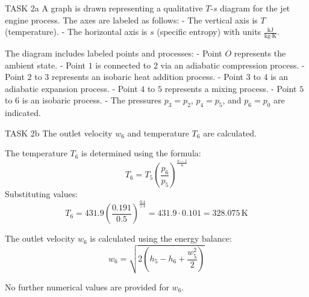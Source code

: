 TASK 2a  
A graph is drawn representing a qualitative \( T \)-\( s \) diagram for the jet engine process. The axes are labeled as follows:  
- The vertical axis is \( T \) (temperature).  
- The horizontal axis is \( s \) (specific entropy) with units \( \frac{\text{kJ}}{\text{kg·K}} \).  

The diagram includes labeled points and processes:  
- Point \( O \) represents the ambient state.  
- Point \( 1 \) is connected to \( 2 \) via an adiabatic compression process.  
- Point \( 2 \) to \( 3 \) represents an isobaric heat addition process.  
- Point \( 3 \) to \( 4 \) is an adiabatic expansion process.  
- Point \( 4 \) to \( 5 \) represents a mixing process.  
- Point \( 5 \) to \( 6 \) is an isobaric process.  
- The pressures \( p_3 = p_2 \), \( p_4 = p_5 \), and \( p_6 = p_0 \) are indicated.  

TASK 2b  
The outlet velocity \( w_6 \) and temperature \( T_6 \) are calculated.  

The temperature \( T_6 \) is determined using the formula:  
\[
T_6 = T_5 \left( \frac{p_6}{p_5} \right)^{\frac{\kappa - 1}{\kappa}}
\]  
Substituting values:  
\[
T_6 = 431.9 \left( \frac{0.191}{0.5} \right)^{\frac{0.4}{1.4}} = 431.9 \cdot 0.101 = 328.075 \, \text{K}
\]  

The outlet velocity \( w_6 \) is calculated using the energy balance:  
\[
w_6 = \sqrt{2 \left( h_5 - h_6 + \frac{w_5^2}{2} \right)}
\]  

No further numerical values are provided for \( w_6 \).